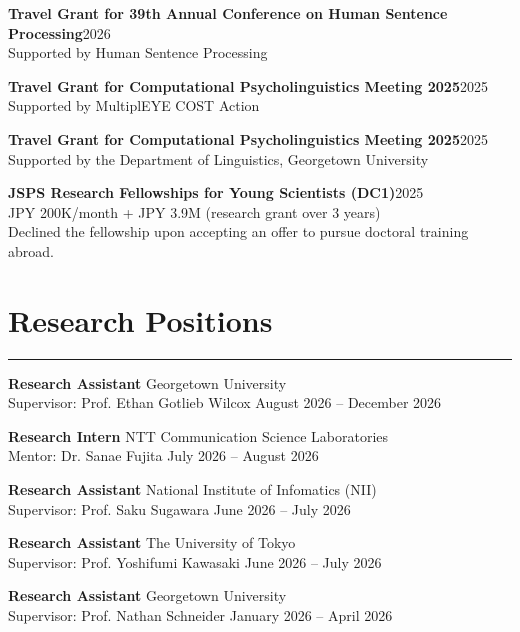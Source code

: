 \documentclass[10pt,a4paper]{article}
\newcommand{\entrygap}{\vspace{6pt}}
\newcommand{\rulegap}{\vspace{6pt}}
\begin{document}
\textbf{Travel Grant for 39th Annual Conference on Human Sentence Processing}\hfill{2026} \\
Supported by Human Sentence Processing

\entrygap

\textbf{Travel Grant for Computational Psycholinguistics Meeting 2025}\hfill{2025} \\
Supported by MultiplEYE COST Action

\entrygap

\textbf{Travel Grant for Computational Psycholinguistics Meeting 2025}\hfill{2025} \\
Supported by the Department of Linguistics, Georgetown University

\entrygap

\textbf{JSPS Research Fellowships for Young Scientists (DC1)}\hfill{2025} \\
JPY 200K/month + JPY 3.9M (research grant over 3 years) \\
Declined the fellowship upon accepting an offer to pursue doctoral training abroad.
\entrygap

\section*{Research Positions}
\hrule
\rulegap

\textbf{Research Assistant}
\hfill{Georgetown University} \\
Supervisor: Prof. Ethan Gotlieb Wilcox
\hfill{August 2026 -- December 2026}

\entrygap

\textbf{Research Intern}
\hfill{NTT Communication Science Laboratories} \\
Mentor: Dr. Sanae Fujita
\hfill{July 2026 -- August 2026}

\entrygap

\textbf{Research Assistant}
\hfill{National Institute of Infomatics (NII)} \\
Supervisor: Prof. Saku Sugawara
\hfill{June 2026 -- July 2026}

\entrygap

\textbf{Research Assistant}
\hfill{The University of Tokyo} \\
Supervisor: Prof. Yoshifumi Kawasaki
\hfill{June 2026 -- July 2026}

\entrygap

\textbf{Research Assistant}
\hfill{Georgetown University} \\
Supervisor: Prof. Nathan Schneider
\hfill{January 2026 -- April 2026}
\end{document}
